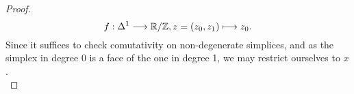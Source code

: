 \begin{prop}
\begin{proof}
      \[
        f:\Delta^1 \longrightarrow \mathbb{R}/\mathbb{Z}, z = (z_0,z_1) \longmapsto z_0.
      \]
      Since it suffices to check comutativity on non-degenerate simplices, and as the simplex in degree 0 is a face of the one in degree 1, we may restrict ourselves to $x$.\\

\end{proof}
\end{prop}
